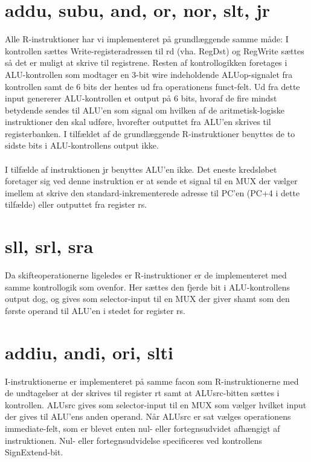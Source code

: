 \documentclass[10pt,a4paper,danish]{article}
\begin{document}
\section{addu, subu, and, or, nor, slt, jr}
Alle R-instruktioner har vi implementeret på grundlæggende samme måde: I
kontrollen sættes Write-registeradressen til rd (vha. RegDst) og RegWrite sættes
så det er muligt at skrive til registrene. Resten af kontrollogikken
foretages i ALU-kontrollen som modtager en 3-bit wire indeholdende
ALUop-signalet fra kontrollen samt de 6 bits der hentes ud fra operationens
funct-felt. Ud fra dette input genererer ALU-kontrollen et output på 6 bits,
hvoraf de fire mindst betydende sendes til ALU'en som signal om hvilken af de
aritmetisk-logiske instruktioner den skal udføre, hvorefter outputtet fra ALU'en
skrives til registerbanken. I tilfældet af de grundlæggende R-instruktioner
benyttes de to sidste bits i ALU-kontrollens output ikke.

\paragraph{}
I tilfælde af instruktionen jr benyttes ALU'en ikke. Det eneste kredsløbet
foretager sig ved denne instruktion er at sende et signal til en MUX der vælger
imellem at skrive den standard-inkrementerede adresse til PC'en (PC+4 i dette
tilfælde) eller outputtet fra register rs. 

\section{sll, srl, sra}
Da skifteoperationerne ligeledes er R-instruktioner er de implementeret med
samme kontrollogik som ovenfor. Her sættes den fjerde bit i ALU-kontrollens
output dog, og gives som selector-input til en MUX der giver shamt som den
første operand til ALU'en i stedet for register rs. 

\section{addiu, andi, ori, slti} 
I-instruktionerne er implementeret på samme facon som R-instruktionerne med de
undtagelser at der skrives til register rt samt at ALUsrc-bitten sættes i
kontrollen. ALUsrc gives som selector-input til en MUX som vælger hvilket input
der gives til ALU'ens anden operand. Når ALUsrc er sat vælges operationens
immediate-felt, som er blevet enten nul- eller fortegnsudvidet afhængigt af
instruktionen. Nul- eller fortegnsudvidelse specificeres ved kontrollens
SignExtend-bit. 
\end{document}
